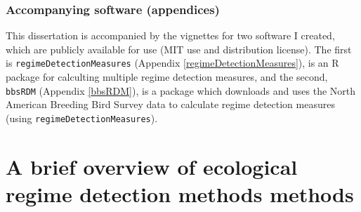 \documentclass[12pt,twoside,openany]{reedthesis}
\begin{document}
\subsection{Accompanying software
(appendices)}\label{accompanying-software-appendices}

This dissertation is accompanied by the vignettes for two software I
created, which are publicly available for use (MIT use and distribution
license). The first is \texttt{regimeDetectionMeasures} (Appendix
\ref{regimeDetectionMeasures}), is an R package for calculting multiple
regime detection measures, and the second, \texttt{bbsRDM} (Appendix
\ref{bbsRDM}), is a package which downloads and uses the North American
Breeding Bird Survey data to calculate regime detection measures (using
\texttt{regimeDetectionMeasures}).

\chapter{A brief overview of ecological regime detection methods
methods}\label{rdmReview}
\end{document}
